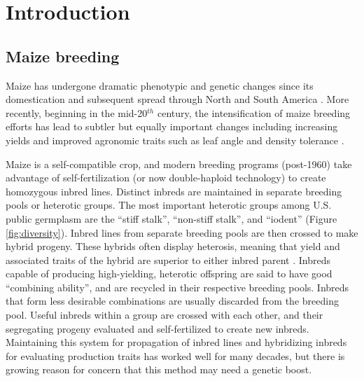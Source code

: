 \documentclass[final,12pt]{article}
\begin{document}
\section*{Introduction}
\label{sec:introduction}



\subsection*{Maize breeding}
Maize has undergone dramatic phenotypic and genetic changes since its domestication and subsequent spread through North and South America \citep{daFonseca:2015ey,Doebley:2004ce}. More recently, beginning in the mid-20$^{th}$ century, the intensification of maize breeding efforts has lead to subtler but equally important changes including increasing yields and improved agronomic traits such as leaf angle and density tolerance \citep{duvick2005contribution}. 

Maize is  a self-compatible crop, and modern breeding programs (post-1960) take advantage of self-fertilization (or now double-haploid technology) to create homozygous inbred lines. 
Distinct inbreds are maintained in separate breeding pools or heterotic groups.
The most important heterotic groups among U.S. public germplasm are the ``stiff stalk'', ``non-stiff stalk'', and ``iodent'' (Figure \ref{fig:diversity}).
Inbred lines from separate breeding pools are then crossed to make hybrid progeny.  
These hybrids often display heterosis, meaning that yield and associated traits of the hybrid are superior to  either inbred parent \citep{Springer:2007bj}.  
Inbreds capable of producing high-yielding, heterotic offspring are said to have good ``combining ability'', and are recycled in their respective breeding pools.
Inbreds that form less desirable combinations are usually discarded from the breeding pool. 
Useful inbreds within a group are crossed with each other, and their segregating progeny evaluated and self-fertilized to create new inbreds. 
Maintaining this system for propagation of inbred lines and hybridizing inbreds for evaluating production traits has worked well for many decades, but there is growing reason for concern that this method may need a genetic boost. 
\end{document}
